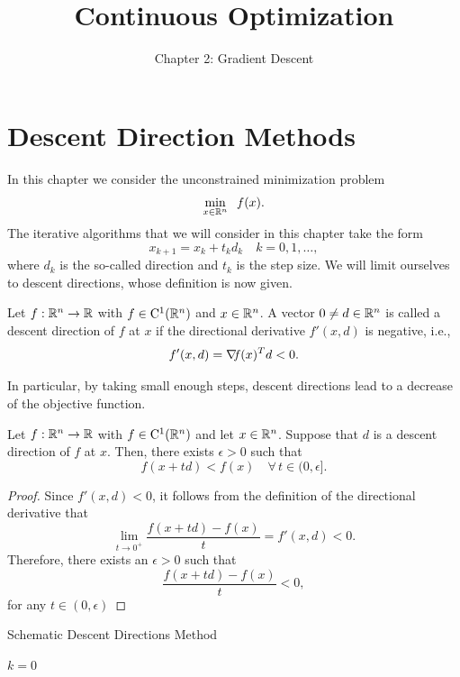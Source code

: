 \documentclass[10pt,a4paper]{article}
\title{Continuous Optimization}
\author{Chapter 2: Gradient Descent}
\date{}
\begin{document}
	\maketitle
	\section{Descent Direction Methods}
	\noindent In this chapter we consider the unconstrained minimization problem
	\begin{equation*}
		\min_{x\in\mathbb{R}^n} \;\; f(x).
	\end{equation*}
The iterative algorithms that we will consider in this chapter take the form
\begin{equation*}
	x_{k+1} = x_k +t_k d_k \quad k=0,1, \dots,
\end{equation*}
where $d_k$ is the so-called direction and $t_k$ is the step size. We will limit ourselves to descent
directions, whose definition is now given.
\begin{definition}
	Let $f:\mathbb{R}^n\to\mathbb{R}$ with $f\in\mathord{\mathrm{C^1}}(\mathbb{R}^n)$ and $x\in \mathbb{R}^n$. A vector $0\neq d\in \mathbb{R}^n$ is called a descent direction of $f$ at $x$ if the directional derivative $f'(x,d)$ is negative, i.e., 
	\begin{equation*}
		f'(x,d)= \operatorname*{\mathit{\nabla \!f}}(x)^T d < 0.
	\end{equation*}
\end{definition}
\noindent In particular, by taking small enough steps, descent directions lead to a decrease of the objective function.
\begin{lemma}
	Let $f:\mathbb{R}^n\to\mathbb{R}$ with $f\in\mathord{\mathrm{C^1}}(\mathbb{R}^n)$ and let $x\in \mathbb{R}^n$. Suppose that $d$ is a descent direction of $f$ at $x$. Then, there exists $\epsilon>0$ such that 
	\begin{equation*}
		f(x+td) < f(x) \quad \forall \, t \in (0,\epsilon].
	\end{equation*} 
\end{lemma}
\begin{proof}
	Since $f'(x,d)<0$, it follows from the definition of the directional derivative that 
	\begin{equation*}
		\lim_{t\to 0^+}\frac{f(x+td)-f(x)}{t} = f'(x,d) <0.
	\end{equation*}
Therefore, there exists an $\epsilon>0$ such that 
\begin{equation*}
	\frac{f(x+td)-f(x)}{t}<0,
\end{equation*}
for any $t\in(0,\epsilon)$
\end{proof}
\begin{algorithm}[H]\label{alg}
	\caption{Schematic Descent Directions Method}
	
	
	$k = 0$
	
\end{algorithm}
\end{document}
